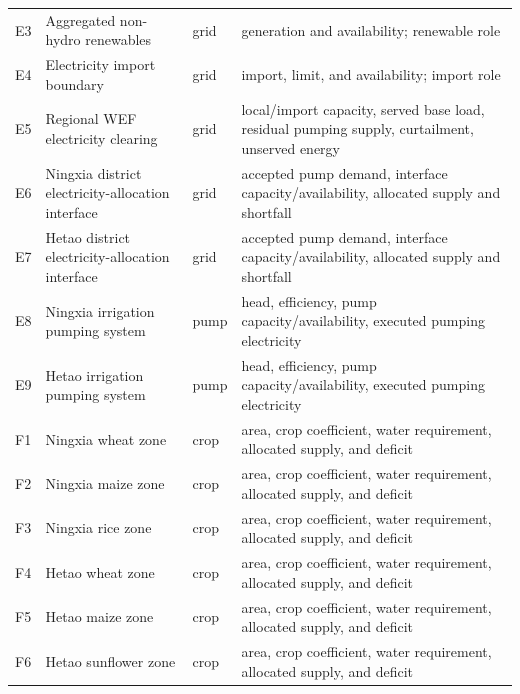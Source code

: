 \documentclass [a4paper,fleqn] {cas-dc}
\begin{document}
\begin{minipage}{\textwidth}
\begin{tabularx}{\textwidth}{@{}l >{\raggedright\arraybackslash}p{} l
  >{\raggedright\arraybackslash}X@{}}
E3 & Aggregated non-hydro renewables & grid & generation and availability; renewable role \\
E4 & Electricity import boundary & grid & import, limit, and availability; import role \\
E5 & Regional WEF electricity clearing & grid & local/import capacity, served base load, residual pumping supply, curtailment, unserved energy \\
E6 & Ningxia district electricity-allocation interface & grid & accepted pump demand, interface capacity/availability, allocated supply and shortfall \\
E7 & Hetao district electricity-allocation interface & grid & accepted pump demand, interface capacity/availability, allocated supply and shortfall \\
E8 & Ningxia irrigation pumping system & pump & head, efficiency, pump capacity/availability, executed pumping electricity \\
E9 & Hetao irrigation pumping system & pump & head, efficiency, pump capacity/availability, executed pumping electricity \\
\midrule
F1 & Ningxia wheat zone & crop & area, crop coefficient, water requirement, allocated supply, and deficit \\
F2 & Ningxia maize zone & crop & area, crop coefficient, water requirement, allocated supply, and deficit \\
F3 & Ningxia rice zone & crop & area, crop coefficient, water requirement, allocated supply, and deficit \\
F4 & Hetao wheat zone & crop & area, crop coefficient, water requirement, allocated supply, and deficit \\
F5 & Hetao maize zone & crop & area, crop coefficient, water requirement, allocated supply, and deficit \\
F6 & Hetao sunflower zone & crop & area, crop coefficient, water requirement, allocated supply, and deficit \\
\bottomrule
\end{tabularx}
\end{minipage}


\end{document}
